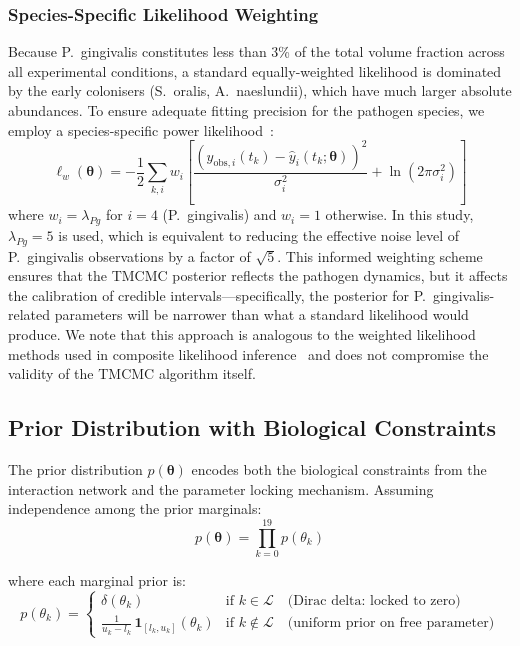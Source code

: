 \documentclass[11pt,a4paper]{article}
\begin{document}
\subsubsection{Species-Specific Likelihood Weighting}

Because P.~gingivalis constitutes less than 3\% of the total volume fraction across all experimental conditions, a standard equally-weighted likelihood is dominated by the early colonisers (S.~oralis, A.~naeslundii), which have much larger absolute abundances.
To ensure adequate fitting precision for the pathogen species, we employ a species-specific power likelihood~\cite{Holmes2017Power}:
\begin{equation}
  \ell_w(\boldsymbol{\theta}) = -\frac{1}{2} \sum_{k,i} w_i \left[ \frac{(y_{\mathrm{obs},i}(t_k) - \hat{y}_i(t_k;\boldsymbol{\theta}))^2}{\sigma_i^2} + \ln(2\pi\sigma_i^2) \right]
  \label{eq:power_lik}
\end{equation}
where $w_i = \lambda_{Pg}$ for $i = 4$ (P.~gingivalis) and $w_i = 1$ otherwise.
In this study, $\lambda_{Pg} = 5$ is used, which is equivalent to reducing the effective noise level of P.~gingivalis observations by a factor of $\sqrt{5}$.
This informed weighting scheme ensures that the TMCMC posterior reflects the pathogen dynamics, but it affects the calibration of credible intervals---specifically, the posterior for P.~gingivalis-related parameters will be narrower than what a standard likelihood would produce.
We note that this approach is analogous to the weighted likelihood methods used in composite likelihood inference~\cite{VarinReid2011} and does not compromise the validity of the TMCMC algorithm itself.

\subsection{Prior Distribution with Biological Constraints}

The prior distribution $p(\boldsymbol{\theta})$ encodes both the biological constraints from the interaction network and the parameter locking mechanism. Assuming independence among the prior marginals:
\begin{equation}
p(\boldsymbol{\theta}) = \prod_{k=0}^{19} p(\theta_k)
\end{equation}

\noindent where each marginal prior is:
\begin{equation}
p(\theta_k) = \begin{cases}
\delta(\theta_k) & \text{if } k \in \mathcal{L} \quad \text{(Dirac delta: locked to zero)} \\[4pt]
\displaystyle\frac{1}{u_k - l_k}\, \mathbf{1}_{[l_k, u_k]}(\theta_k) & \text{if } k \notin \mathcal{L} \quad \text{(uniform prior on free parameter)}
\end{cases}
\label{eq:prior}
\end{equation}
\end{document}
